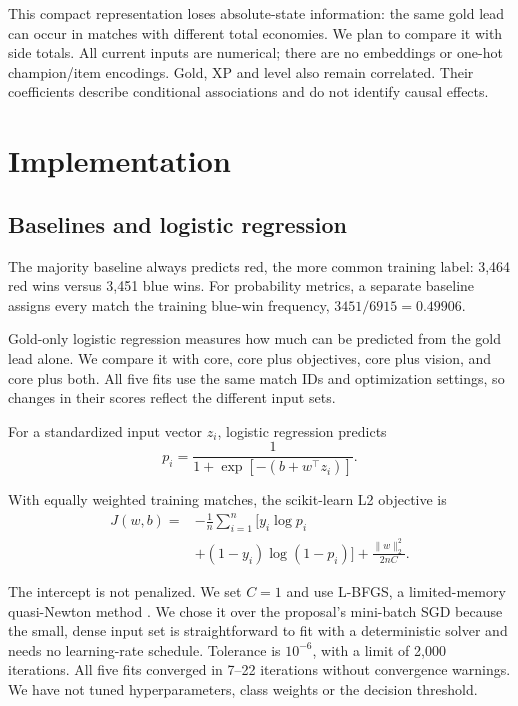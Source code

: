 \documentclass[11pt]{article}
\begin{document}
This compact representation loses absolute-state information: the same gold lead can occur in matches with different total economies. We plan to compare it with side totals. All current inputs are numerical; there are no embeddings or one-hot champion/item encodings. Gold, XP and level also remain correlated. Their coefficients describe conditional associations and do not identify causal effects.

\section{Implementation}

\subsection{Baselines and logistic regression}

The majority baseline always predicts red, the more common training label: 3,464 red wins versus 3,451 blue wins. For probability metrics, a separate baseline assigns every match the training blue-win frequency, $3451/6915=0.49906$.

Gold-only logistic regression measures how much can be predicted from the gold lead alone. We compare it with core, core plus objectives, core plus vision, and core plus both. All five fits use the same match IDs and optimization settings, so changes in their scores reflect the different input sets.

For a standardized input vector $z_i$, logistic regression predicts
\begin{equation}
 p_i=\frac{1}{1+\exp[-(b+w^\top z_i)]}.
\end{equation}
\begin{samepage}
With equally weighted training matches, the scikit-learn L2 objective is
\begin{align}
 J(w,b)={}&-\frac{1}{n}\sum_{i=1}^{n}\bigl[y_i\log p_i\nonumber\\
 &+(1-y_i)\log(1-p_i)\bigr]+\frac{\lVert w\rVert_2^2}{2nC}.
\end{align}
\end{samepage}
The intercept is not penalized. We set $C=1$ and use L-BFGS, a limited-memory quasi-Newton method \citep{sklearnlogistic}. We chose it over the proposal's mini-batch SGD because the small, dense input set is straightforward to fit with a deterministic solver and needs no learning-rate schedule. Tolerance is $10^{-6}$, with a limit of 2,000 iterations. All five fits converged in 7--22 iterations without convergence warnings. We have not tuned hyperparameters, class weights or the decision threshold.
\end{document}
